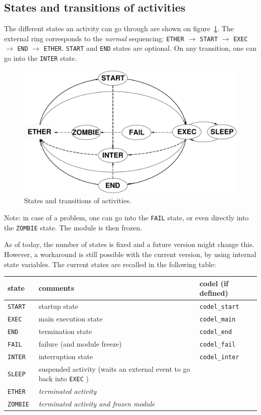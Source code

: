 \subsection{States and transitions of activities}

The   different  states   an  activity can   go   through  are  shown  on
figure~\ref{fig|states}. The external ring corresponds to the \emph{normal}
sequencing: \texttt{ETHER} $\rightarrow$   \texttt{START} $\rightarrow$   
\texttt{EXEC} $\rightarrow$ \texttt{END}  $\rightarrow$ \texttt{ETHER}. \texttt{START} and
\texttt{END}  states are optional.   On any transition, one  can go into the
\texttt{INTER} state.

\begin{figure}[htbp]
\centering
\includegraphics[width=0.8\hsize]{fig/activity-states}
\caption{States and transitions of activities.}
\label{fig|states}
\end{figure}

Note: in case of a problem, one can go into the \texttt{FAIL} state, or even
directly into the \texttt{ZOMBIE} state. The module is then frozen.

As of today, the  number of states is fixed  and  a future version  might
change this.  However, a workaround  is  still possible with the  current
version, by using internal   state   variables. The current  states   are
recalled in the following table:

\bigbreak

{\small\begin{tabularx}{0.8\linewidth}{|l||X|l|}
\hline
state 	& comments 	& codel (if defined)	  \\
\hline
\tt START  & startup state 
		& \tt codel\_start 	\\
\tt EXEC   & main execution state & \tt codel\_main  \\
\tt END    & termination state 	& \tt codel\_end \\
\tt FAIL   & failure (and module freeze) \em 
					& \tt codel\_fail \\
\hline
\tt INTER  & interruption state 
					& \tt codel\_inter  \\
\hline
\tt SLEEP     	&  suspended activity (waits an external event to go back
into  \texttt{EXEC} ) & \\
\tt ETHER    	& \em terminated activity  & \\
\tt ZOMBIE   	& \em terminated activity and frozen module & \\
\hline
\end{tabularx}}

